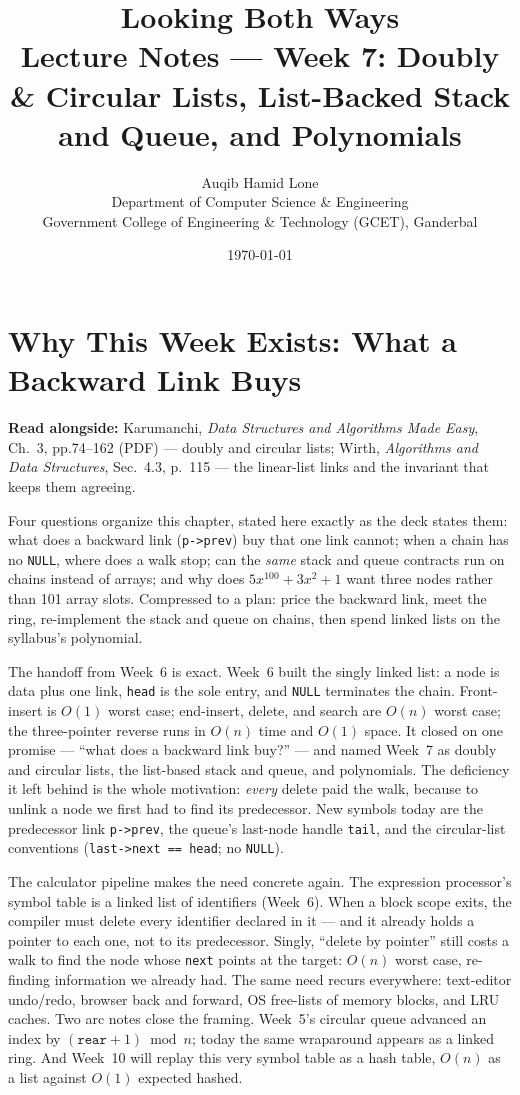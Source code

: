 \documentclass[11pt]{article}
\title{Looking Both Ways\\\large Lecture Notes --- Week 7: Doubly \& Circular Lists, List-Backed Stack and Queue, and Polynomials}
\author{Auqib Hamid Lone\\[0.3em]
  \small Department of Computer Science \& Engineering\\
  \small Government College of Engineering \& Technology (GCET), Ganderbal}
\date{\today}
\begin{document}
\maketitle

\section{Why This Week Exists: What a Backward Link Buys}

\textbf{Read alongside:} Karumanchi, \textit{Data Structures and Algorithms Made Easy}, Ch.~3, pp.74--162 (PDF) --- doubly and circular lists; Wirth, \textit{Algorithms and Data Structures}, Sec.~4.3, p.~115 --- the linear-list links and the invariant that keeps them agreeing.

Four questions organize this chapter, stated here exactly as the deck states them: what does a backward link (\texttt{p->prev}) buy that one link cannot; when a chain has no \texttt{NULL}, where does a walk stop; can the \emph{same} stack and queue contracts run on chains instead of arrays; and why does $5x^{100} + 3x^{2} + 1$ want three nodes rather than 101 array slots. Compressed to a plan: price the backward link, meet the ring, re-implement the stack and queue on chains, then spend linked lists on the syllabus's polynomial.

The handoff from Week~6 is exact. Week~6 built the singly linked list: a node is data plus one link, \texttt{head} is the sole entry, and \texttt{NULL} terminates the chain. Front-insert is $O(1)$ worst case; end-insert, delete, and search are $O(n)$ worst case; the three-pointer reverse runs in $O(n)$ time and $O(1)$ space. It closed on one promise --- ``what does a backward link buy?'' --- and named Week~7 as doubly and circular lists, the list-based stack and queue, and polynomials. The deficiency it left behind is the whole motivation: \emph{every} delete paid the walk, because to unlink a node we first had to find its predecessor. New symbols today are the predecessor link \texttt{p->prev}, the queue's last-node handle \texttt{tail}, and the circular-list conventions (\texttt{last->next == head}; no \texttt{NULL}).

The calculator pipeline makes the need concrete again. The expression processor's symbol table is a linked list of identifiers (Week~6). When a block scope exits, the compiler must delete every identifier declared in it --- and it already holds a pointer to each one, not to its predecessor. Singly, ``delete by pointer'' still costs a walk to find the node whose \texttt{next} points at the target: $O(n)$ worst case, re-finding information we already had. The same need recurs everywhere: text-editor undo/redo, browser back and forward, OS free-lists of memory blocks, and LRU caches. Two arc notes close the framing. Week~5's circular queue advanced an index by $(\texttt{rear} + 1) \bmod n$; today the same wraparound appears as a linked ring. And Week~10 will replay this very symbol table as a hash table, $O(n)$ as a list against $O(1)$ expected hashed. 
\end{document}
